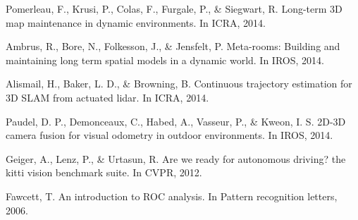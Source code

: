 \documentclass[10pt,twocolumn,letterpaper]{article}  %
\begin{document}
\begin{thebibliography}{99}
 Pomerleau, F., Krusi, P., Colas, F., Furgale, P., \& Siegwart, R. Long-term 3D map maintenance in dynamic environments. In ICRA, 2014.

 Ambrus, R., Bore, N., Folkesson, J., \& Jensfelt, P. Meta-rooms: Building and maintaining long term spatial models in a dynamic world. In IROS, 2014.

 Alismail, H., Baker, L. D., \& Browning, B. Continuous trajectory estimation for 3D SLAM from actuated lidar. In ICRA, 2014.

Paudel, D. P., Demonceaux, C., Habed, A., Vasseur, P., \& Kweon, I. S. 2D-3D camera fusion for visual odometry in outdoor environments. In IROS, 2014.

 Geiger, A., Lenz, P., \& Urtasun, R. Are we ready for autonomous driving? the kitti vision benchmark suite. In CVPR, 2012.

 Fawcett, T. An introduction to ROC analysis. In Pattern recognition letters,  2006.

\pagebreak
\addtolength{\textheight}{-10cm}

\end{thebibliography}
\end{document}
